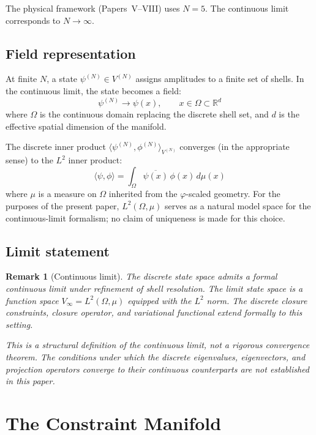 \documentclass[12pt]{article}
\newtheorem{remark}[theorem]{Remark}
\newcommand{\phig}{\varphi}
\begin{document}
The physical framework (Papers~V--VIII) uses $N = 5$. The continuous limit corresponds to $N \to \infty$.

\subsection{Field representation}

At finite $N$, a state $\psi^{(N)} \in V^{(N)}$ assigns amplitudes to a finite set of shells. In the continuous limit, the state becomes a field:
\begin{equation}
    \psi^{(N)} \to \psi(x), \qquad x \in \Omega \subset \mathbb{R}^d
\end{equation}
where $\Omega$ is the continuous domain replacing the discrete shell set, and $d$ is the effective spatial dimension of the manifold.

The discrete inner product $\langle\psi^{(N)}, \phi^{(N)}\rangle_{V^{(N)}}$ converges (in the appropriate sense) to the $L^2$ inner product:
\begin{equation}
    \langle\psi, \phi\rangle = \int_\Omega \overline{\psi(x)}\, \phi(x)\, d\mu(x)
\end{equation}
where $\mu$ is a measure on $\Omega$ inherited from the $\phig$-scaled geometry. For the purposes of the present paper, $L^2(\Omega, \mu)$ serves as a natural model space for the continuous-limit formalism; no claim of uniqueness is made for this choice.

\subsection{Limit statement}

\begin{remark}[Continuous limit]
The discrete state space admits a formal continuous limit under refinement of shell resolution. The limit state space is a function space $V_\infty = L^2(\Omega, \mu)$ equipped with the $L^2$ norm. The discrete closure constraints, closure operator, and variational functional extend formally to this setting.

This is a structural definition of the continuous limit, not a rigorous convergence theorem. The conditions under which the discrete eigenvalues, eigenvectors, and projection operators converge to their continuous counterparts are not established in this paper.
\end{remark}

\section{The Constraint Manifold}\label{sec:manifold}
\end{document}
